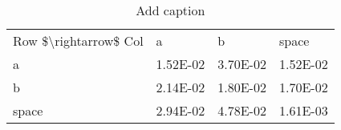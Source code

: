 \begin{table}[htbp]
  \centering
  \caption{Add caption}
    \begin{tabular}{lrrr}
    Row \$\textbackslash{}rightarrow\$ Col & \multicolumn{1}{l}{a} & \multicolumn{1}{l}{b} & \multicolumn{1}{l}{space} \\
    a     & 1.52E-02 & 3.70E-02 & 1.52E-02 \\
    b     & 2.14E-02 & 1.80E-02 & 1.70E-02 \\
    space & 2.94E-02 & 4.78E-02 & 1.61E-03 \\
    \end{tabular}%
  \label{tab:addlabel}%
\end{table}%
